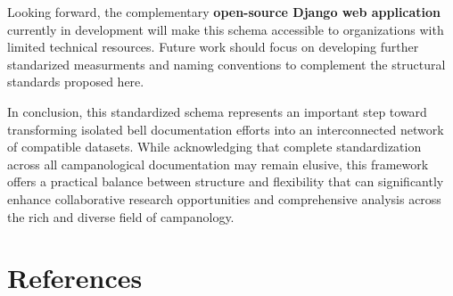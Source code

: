 \documentclass[11pt, a4paper]{article}
\begin{document}
Looking forward, the complementary \textbf{open-source Django web application} currently in development will make this schema accessible to organizations with limited technical resources. Future work should focus on developing further standarized measurments and naming conventions to complement the structural standards proposed here. 

In conclusion, this standardized schema represents an important step toward transforming isolated bell documentation efforts into an interconnected network of compatible datasets. While acknowledging that complete standardization across all campanological documentation may remain elusive, this framework offers a practical balance between structure and flexibility that can significantly enhance collaborative research opportunities and comprehensive analysis across the rich and diverse field of campanology.

\section{References}

\nocite{*}


\end{document}
